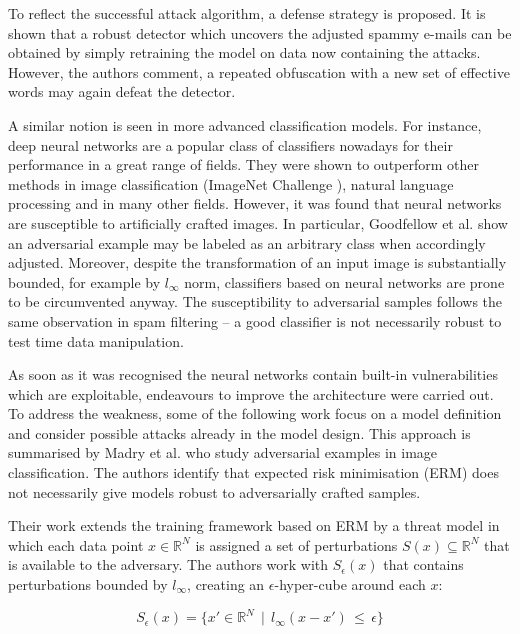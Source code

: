 To reflect the successful attack algorithm, a defense strategy is
proposed. It is shown that a robust detector which uncovers the adjusted
spammy e-mails can be obtained by simply retraining the model on data
now containing the attacks. However, the authors comment, a repeated
obfuscation with a new set of effective words may again defeat the
detector.

A similar notion is seen in more advanced classification models. For
instance, deep neural networks are a popular class of classifiers
nowadays for their performance in a great range of fields. They were
shown to outperform other methods in image classification (ImageNet
Challenge \cite{image_net}), natural language processing \cite{transformer}
and in many other fields. However, it was found that neural networks
are susceptible to artificially crafted images. In particular, Goodfellow et al. \cite{adversarial_examples} show an adversarial example may be labeled as an
arbitrary class when accordingly adjusted. Moreover, despite the
transformation of an input image is substantially bounded, for example
by $l_\infty$ norm, classifiers based on neural networks are prone to
be circumvented anyway\cite{adversarial_examples_2}. The susceptibility to
adversarial samples follows the same observation in spam filtering – a
good classifier is not necessarily robust to test time data
manipulation.

As soon as it was recognised the neural networks contain built-in
vulnerabilities which are exploitable, endeavours to improve the
architecture were carried out. To address the weakness, some of the
following work focus on a model definition and consider possible attacks
already in the model design. This approach is summarised by Madry et al.
\cite{towards_deep_learning_models} who study adversarial examples
 in image classification.
The authors identify that expected risk minimisation (ERM) does not
necessarily give models robust to adversarially crafted samples.

Their work extends the training framework based on ERM by a threat model
in which each data point $x \in \mathbb{R}^N$ is assigned a set of
perturbations $S(x) \subseteq \mathbb{R}^N$ that is available to the
adversary. The authors work with $S_\epsilon(x)$ that contains
perturbations bounded by $l_\infty$, creating an
$\epsilon$-hyper-cube around each $x$:

\begin{equation}
S_\epsilon(x) = \{x' \in \mathbb{R}^N \, \mid \, l_\infty(x - x') \, \leq \, \epsilon \}
\end{equation}

